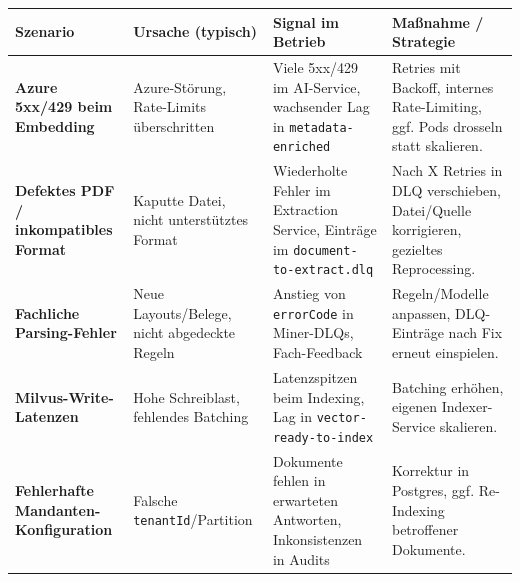 {\def\LTcaptype{none} %
\begin{longtable}[]{@{}
  >{\raggedright\arraybackslash}p{}
  >{\raggedright\arraybackslash}p{}
  >{\raggedright\arraybackslash}p{}
  >{\raggedright\arraybackslash}p{}@{}}
\toprule\noalign{}
\begin{minipage}[b]{\linewidth}\raggedright
Szenario
\end{minipage} & \begin{minipage}[b]{\linewidth}\raggedright
Ursache (typisch)
\end{minipage} & \begin{minipage}[b]{\linewidth}\raggedright
Signal im Betrieb
\end{minipage} & \begin{minipage}[b]{\linewidth}\raggedright
Maßnahme / Strategie
\end{minipage} \\
\midrule\noalign{}
\endhead
\bottomrule\noalign{}
\endlastfoot
\textbf{Azure 5xx/429 beim Embedding} & Azure-Störung, Rate-Limits
überschritten & Viele 5xx/429 im AI-Service, wachsender Lag in
\texttt{metadata-enriched} & Retries mit Backoff, internes
Rate-Limiting, ggf. Pods drosseln statt skalieren. \\
\textbf{Defektes PDF / inkompatibles Format} & Kaputte Datei, nicht
unterstütztes Format & Wiederholte Fehler im Extraction Service,
Einträge im \texttt{document-to-extract.dlq} & Nach X Retries in DLQ
verschieben, Datei/Quelle korrigieren, gezieltes Reprocessing. \\
\textbf{Fachliche Parsing-Fehler} & Neue Layouts/Belege, nicht
abgedeckte Regeln & Anstieg von \texttt{errorCode} in Miner-DLQs,
Fach-Feedback & Regeln/Modelle anpassen, DLQ-Einträge nach Fix erneut
einspielen. \\
\textbf{Milvus-Write-Latenzen} & Hohe Schreiblast, fehlendes Batching &
Latenzspitzen beim Indexing, Lag in \texttt{vector-ready-to-index} &
Batching erhöhen, eigenen Indexer-Service skalieren. \\
\textbf{Fehlerhafte Mandanten-Konfiguration} & Falsche
\texttt{tenantId}/Partition & Dokumente fehlen in erwarteten Antworten,
Inkonsistenzen in Audits & Korrektur in Postgres, ggf. Re-Indexing
betroffener Dokumente. \\
\end{longtable}
}

